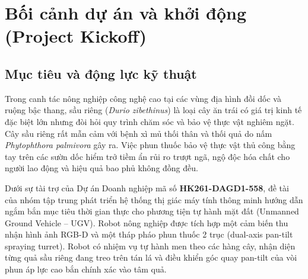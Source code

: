 \documentclass[12pt,a4paper]{article}
\begin{document}
\section{Bối cảnh dự án và khởi động (Project Kickoff)}

\subsection{Mục tiêu và động lực kỹ thuật}
Trong canh tác nông nghiệp công nghệ cao tại các vùng địa hình đồi dốc và ruộng bậc thang, sầu riêng (\textit{Durio zibethinus}) là loại cây ăn trái có giá trị kinh tế đặc biệt lớn nhưng đòi hỏi quy trình chăm sóc và bảo vệ thực vật nghiêm ngặt. Cây sầu riêng rất mẫn cảm với bệnh xì mủ thối thân và thối quả do nấm \textit{Phytophthora palmivora} gây ra. Việc phun thuốc bảo vệ thực vật thủ công bằng tay trên các sườn dốc hiểm trở tiềm ẩn rủi ro trượt ngã, ngộ độc hóa chất cho người lao động và hiệu quả bao phủ không đồng đều.

Dưới sự tài trợ của Dự án Doanh nghiệp mã số \textbf{HK261-DAGD1-558}, đề tài của nhóm tập trung phát triển hệ thống thị giác máy tính thông minh hướng dẫn ngắm bắn mục tiêu thời gian thực cho phương tiện tự hành mặt đất (Unmanned Ground Vehicle -- UGV). Robot nông nghiệp được tích hợp một cảm biến thu nhận hình ảnh RGB-D và một tháp pháo phun thuốc 2 trục (dual-axis pan-tilt spraying turret). Robot có nhiệm vụ tự hành men theo các hàng cây, nhận diện từng quả sầu riêng đang treo trên tán lá và điều khiển góc quay pan-tilt của vòi phun áp lực cao bắn chính xác vào tâm quả.
\end{document}

